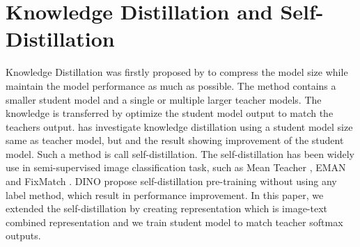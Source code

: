 \section{Knowledge Distillation and Self-Distillation}
Knowledge Distillation was firstly proposed by  to compress the model size while maintain the model performance as much as possible.
The method contains a smaller student model and a single or multiple larger teacher models.
The knowledge is transferred by optimize the student model output to match the teachers output.
 has investigate knowledge distillation using a student model size same as teacher model, but and the result showing improvement of the student model.
Such a method is call self-distillation.
The self-distillation has been widely use in semi-supervised image classification task, such as Mean Teacher , EMAN  and FixMatch .
DINO  propose self-distillation pre-training without using any label method, which result in performance improvement.
In this paper, we extended the self-distillation by creating representation which is image-text combined representation and we train student model to match teacher softmax outputs.


